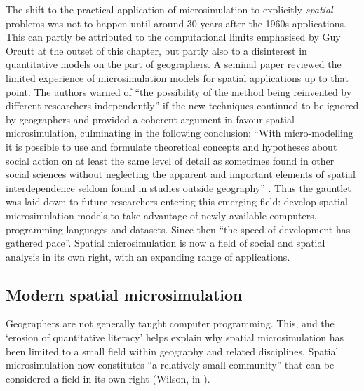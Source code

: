 \documentclass[a4paper, 11pt, twoside]{Thesis}
\begin{document}
The shift to the practical application of microsimulation to explicitly
\emph{spatial} problems was not to happen until around 30 years after the
1960s applications. This can partly be attributed to the
computational limits emphasised by Guy Orcutt at the outset of this chapter, but
partly also to a disinterest in quantitative models on the part of geographers.
A seminal paper \citep{Holm1987} reviewed the limited experience of
microsimulation models for
spatial applications up to that point. The authors warned of ``the
possibility of the method being reinvented by different
researchers independently'' if the new techniques continued to be ignored by
geographers \citep[p.~145]{Holm1987} and provided a coherent argument in favour
spatial microsimulation, culminating in the following conclusion:
``With micro-modelling it is possible to use and formulate theoretical concepts
and hypotheses about social action on at least the same level of detail as
sometimes found in other social sciences  without neglecting the apparent and
important elements of spatial interdependence seldom found in studies outside
geography'' \citep[p.~163]{Holm1987}.
Thus the gauntlet was laid down to future
researchers entering this emerging field: develop spatial microsimulation models
to take advantage of newly available computers, programming languages and
datasets. Since then ``the speed of development has gathered
pace''\citep[p.~259]{clarke2013conclusions}. Spatial microsimulation is now a
field of social and spatial analysis in its own right, with an expanding range
of applications. 

\subsection{Modern spatial microsimulation}
Geographers are not generally taught computer programming.
This, and the `erosion of quantitative literacy' \citep{ESRC2013}
helps explain why spatial microsimulation has been limited to a
small field within geography and related disciplines. Spatial
microsimulation now constitutes ``a relatively small
community'' that can be considered a field in its own right
(Wilson, in \citealp[p.~vi]{Tanton2013}).
\end{document}
